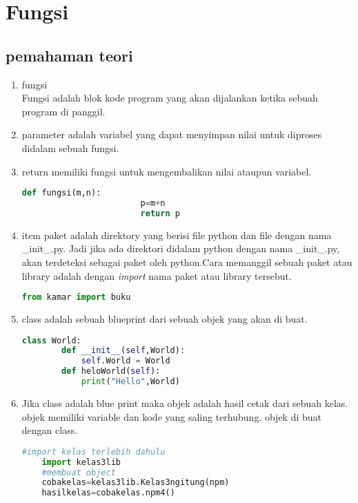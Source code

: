 \section{Fungsi}
		\subsection{pemahaman teori}
			\begin{enumerate}
				\item fungsi\\
				Fungsi adalah blok kode program yang akan dijalankan ketika  sebuah
				program di panggil.\\
				
				\item parameter adalah variabel yang dapat menyimpan nilai untuk diproses didalam sebuah fungsi.
				
				\item return memiliki fungsi untuk mengembalikan nilai ataupun variabel.
				\begin{lstlisting}[language=Python]
				def fungsi(m,n):
						p=m+n
						return p
				\end{lstlisting}
				
				\item item paket adalah direktory yang berisi file python dan file dengan nama \_init\_.py. Jadi jika ada direktori didalam python dengan nama \_init\_.py, akan terdeteksi sebagai paket oleh python.Cara memanggil sebuah paket atau library adalah dengan \textit{import} nama paket atau library tersebut.
				\begin{lstlisting}[language=Python]
				from kamar import buku
				\end{lstlisting}
				
				\item class adalah sebuah blueprint dari sebuah objek yang akan di buat.
				\begin{lstlisting}[language=Python]
	class World:
	    def __init__(self,World):
	        self.World = World
	    def heloWorld(self):
	        print("Hello",World)
				\end{lstlisting}
				
				\item Jika class adalah blue print maka objek adalah hasil cetak dari sebuah kelas. objek memiliki variable dan kode yang saling terhubung. objek di buat dengan class.
				\begin{lstlisting}[language=Python]
	#import kelas terlebih dahulu
	import kelas3lib
	#membuat object
	cobakelas=kelas3lib.Kelas3ngitung(npm) 
	hasilkelas=cobakelas.npm4()
				\end{lstlisting}
				

\end{enumerate}
